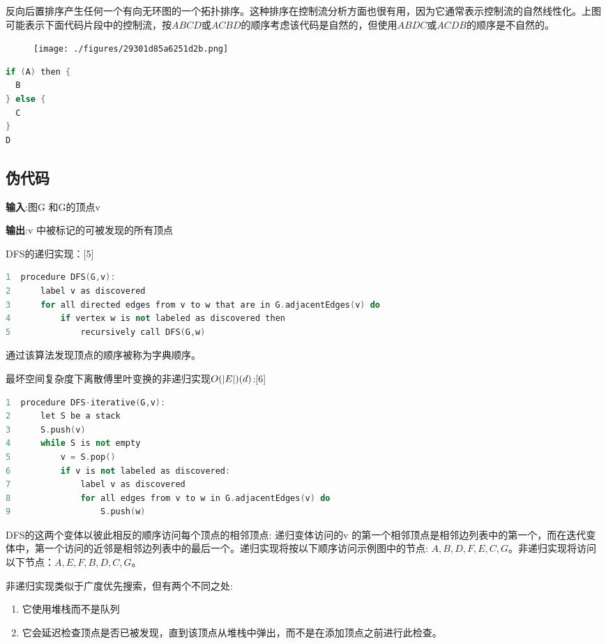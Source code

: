 反向后置排序产生任何一个有向无环图的一个拓扑排序。这种排序在控制流分析方面也很有用，因为它通常表示控制流的自然线性化。上图可能表示下面代码片段中的控制流，按$A B C D$或$A C B D$的顺序考虑该代码是自然的，但使用$A B D C$或$A C D B$的顺序是不自然的。
\begin{figure}[ht]
\centering
\texttt{[image: ./figures/29301d85a6251d2b.png]}
\caption\label{fig_SDYXSS_3}
\end{figure}
\begin{lstlisting}[language=cpp]
if (A) then {
  B
} else {
  C
}
D
\end{lstlisting}

\subsection{伪代码}
\textbf{输入}:图G 和G的顶点v

\textbf{输出}:v 中被标记的可被发现的所有顶点

DFS的递归实现：[5]
\begin{lstlisting}[language=cpp]
1  procedure DFS(G,v):
2      label v as discovered
3      for all directed edges from v to w that are in G.adjacentEdges(v) do
4          if vertex w is not labeled as discovered then
5              recursively call DFS(G,w)
\end{lstlisting}
通过该算法发现顶点的顺序被称为字典顺序。

最坏空间复杂度下离散傅里叶变换的非递归实现$O(|E|) \\ (d)$:[6]
\begin{lstlisting}[language=cpp]
1  procedure DFS-iterative(G,v):
2      let S be a stack
3      S.push(v)
4      while S is not empty
5          v = S.pop()
6          if v is not labeled as discovered:
7              label v as discovered
8              for all edges from v to w in G.adjacentEdges(v) do 
9                  S.push(w)
\end{lstlisting}
DFS的这两个变体以彼此相反的顺序访问每个顶点的相邻顶点: 递归变体访问的v 的第一个相邻顶点是相邻边列表中的第一个，而在迭代变体中，第一个访问的近邻是相邻边列表中的最后一个。递归实现将按以下顺序访问示例图中的节点: $A,B,D,F,E,C,G$。非递归实现将访问以下节点：$A,E,F,B,D,C,G$。

非递归实现类似于广度优先搜索，但有两个不同之处:
\begin{enumerate}
\item 它使用堆栈而不是队列
\item 它会延迟检查顶点是否已被发现，直到该顶点从堆栈中弹出，而不是在添加顶点之前进行此检查。
\end{enumerate}

